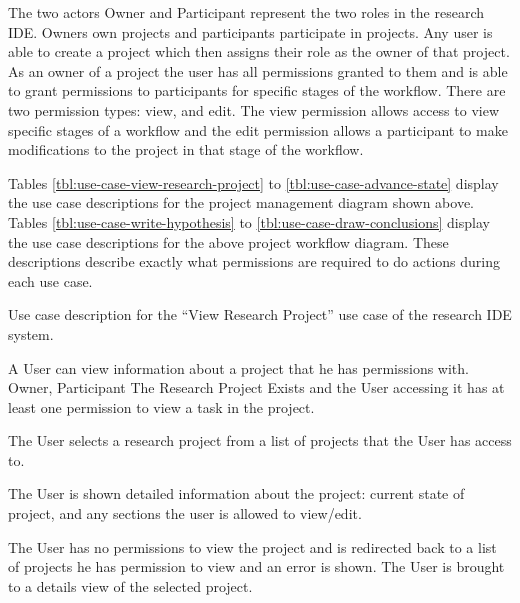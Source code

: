 \FloatBarrier

  The two actors Owner and Participant represent the two roles in the research IDE. Owners own projects and participants participate in projects. Any user is able to create a project which then assigns their role as the owner of that project. As an owner of a project the user has all permissions granted to them and is able to grant permissions to participants for specific stages of the workflow. There are two permission types: view, and edit. The view permission allows access to view specific stages of a workflow and the edit permission allows a participant to make modifications to the project in that stage of the workflow.

  Tables \ref{tbl:use-case-view-research-project} to \ref{tbl:use-case-advance-state} display the use case descriptions for the project management diagram shown above. Tables \ref{tbl:use-case-write-hypothesis} to \ref{tbl:use-case-draw-conclusions} display the use case descriptions for the above project workflow diagram. These descriptions describe exactly what permissions are required to do actions during each use case.
 
\begin{table}
  \centering
  \caption{Use case description for the ``View Research Project'' use case of the research IDE system.}
  \label{tbl:use-case-view-research-project}

  \begin{usecase}
    A User can view information about a project that he has permissions with.
    Owner, Participant
    The Research Project Exists and the User accessing it has at least one permission to view a task in the project.
    \ucnormal
    \begin{ucenum}
      \item The User selects a research project from a list of projects that the User has access to.
      \item The User is shown detailed information about the project: current state of project, and any sections the user is allowed to view/edit.
    \end{ucenum}
    The User has no permissions to view the project and is redirected back to a list of projects he has permission to view and an error is shown.
    The User is brought to a details view of the selected project.
  \end{usecase}
\end{table}



